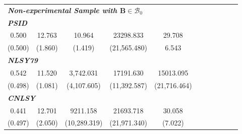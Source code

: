 \begin{tabular}{ccccccccccc}
        \multicolumn{10}{l}{\textit{\textbf{Non-experimental Sample with $\bm{B} \in \mathcal{B}_{0}$}}} \\ 
    \multicolumn{10}{l}{\textit{\textbf{PSID}}} \\
    0.500 &    12.763 &    10.964 & 23298.833 &    29.708 &         &         &         &         &         \\  
    (0.500) &     (1.860) &     (1.419) & (21,565.480) &     6.543 &         &         &         &         &         \\  
    \multicolumn{10}{l}{\textit{\textbf{NLSY79}}} \\
    0.542 &    11.520 &  3,742.031 & 17191.630 & 15013.095 &         &         &         &         &         \\  
    (0.498) &     (1.081) &  (4,107.605) & (11,392.587) & (21,716.464) &         &         &         &         &         \\
    \multicolumn{10}{l}{\textit{\textbf{CNLSY}}} \\  
    0.441 &    12.701 &  9211.158 & 21693.718 &    30.058 &         &         &         &         &         \\  
    (0.497) &     (2.050) & (10,289.319) & (21,971.340) &     (7.022) &         &         &         &         &         \\  \bottomrule \end{tabular}
